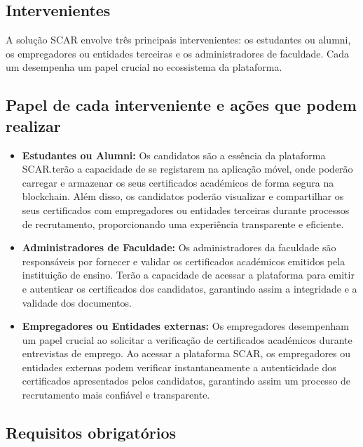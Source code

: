 \documentclass[10pt]{article}
\begin{document}
\subsection*{Intervenientes}

A solução SCAR envolve três principais intervenientes: os estudantes ou alumni, os empregadores ou entidades terceiras e os administradores
de faculdade. Cada um desempenha um papel crucial no ecossistema da plataforma.

\subsection*{Papel de cada interveniente e ações que podem realizar}

\begin{itemize}

    \item \textbf{Estudantes ou Alumni:} Os candidatos são a essência da plataforma SCAR.\@Eles terão a capacidade de se registarem na
          aplicação móvel, onde poderão carregar e armazenar os seus certificados académicos de forma segura na blockchain.
          Além disso, os candidatos poderão visualizar e compartilhar os seus certificados com empregadores ou entidades terceiras durante processos
          de recrutamento, proporcionando uma experiência transparente e eficiente.

    \item \textbf{Administradores de Faculdade:} Os administradores da faculdade são responsáveis por fornecer e validar
          os certificados académicos emitidos pela instituição de ensino. Terão a capacidade de acessar a plataforma 
          para emitir e autenticar os certificados dos candidatos, garantindo assim a integridade e a validade dos documentos.

    \item \textbf{Empregadores ou Entidades externas:} Os empregadores desempenham um papel crucial ao solicitar a verificação de certificados
          académicos durante entrevistas de emprego. Ao acessar a plataforma SCAR, os empregadores ou entidades externas podem verificar
          instantaneamente a autenticidade dos certificados apresentados pelos candidatos, garantindo assim um processo
          de recrutamento mais confiável e transparente.

\end{itemize}

\subsection*{Requisitos obrigatórios}
\end{document}
